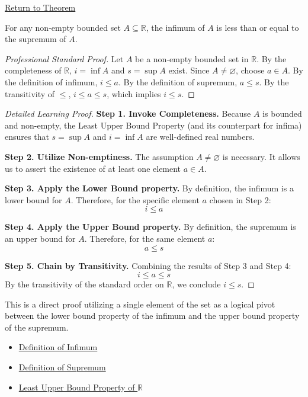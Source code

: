 \newpage
{}
\label{prf:infimum-less-than-supremum}

\begin{remark*}[Return]
\hyperref[thm:infimum-less-than-supremum]{Return to Theorem}
\end{remark*}

\begin{theorem*}
For any non-empty bounded set $A \subseteq \mathbb{R}$, the infimum of $A$ is less than or equal to the supremum of $A$.
\end{theorem*}

\begin{proof}[Professional Standard Proof]
\LRAProofBodyStart
Let $A$ be a non-empty bounded set in $\mathbb{R}$. By the completeness of $\mathbb{R}$, $i = \inf A$ and $s = \sup A$ exist. Since $A \neq \varnothing$, choose $a \in A$. By the definition of infimum, $i \le a$. By the definition of supremum, $a \le s$. By the transitivity of $\le$, $i \le a \le s$, which implies $i \le s$.
\end{proof}

\begin{proof}[Detailed Learning Proof]
\LRAProofBodyStart

\textbf{Step 1. Invoke Completeness.}
Because $A$ is bounded and non-empty, the Least Upper Bound Property (and its counterpart for infima) ensures that $s = \sup A$ and $i = \inf A$ are well-defined real numbers.

\textbf{Step 2. Utilize Non-emptiness.}
The assumption $A \neq \varnothing$ is necessary. It allows us to assert the existence of at least one element $a \in A$.

\textbf{Step 3. Apply the Lower Bound property.}
By definition, the infimum is a lower bound for $A$. Therefore, for the specific element $a$ chosen in Step 2:
\[ i \le a \]

\textbf{Step 4. Apply the Upper Bound property.}
By definition, the supremum is an upper bound for $A$. Therefore, for the same element $a$:
\[ a \le s \]

\textbf{Step 5. Chain by Transitivity.}
Combining the results of Step 3 and Step 4:
\[ i \le a \le s \]
By the transitivity of the standard order on $\mathbb{R}$, we conclude $i \le s$.
\end{proof}

\begin{remark*}
This is a direct proof utilizing a single element of the set as a logical pivot between the lower bound property of the infimum and the upper bound property of the supremum.
\end{remark*}

\begin{dependencies}
\begin{itemize}
  \item \hyperref[def:infimum]{Definition of Infimum}
  \item \hyperref[def:supremum]{Definition of Supremum}
  \item \hyperref[def:least-upper-bound-property]{Least Upper Bound Property of $\mathbb{R}$}
\end{itemize}
\end{dependencies}

\clearpage
